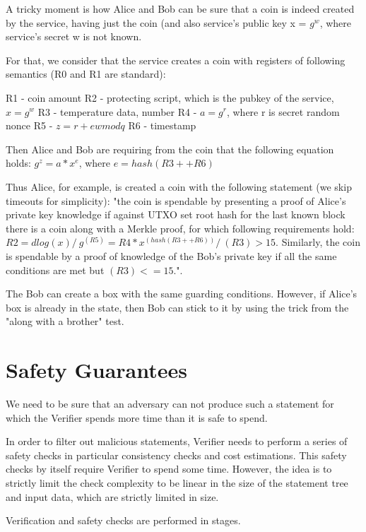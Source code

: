 \documentclass[11pt]{article}
\newcommand{\authnote}[2]{\marginpar{\parbox{\marginparwidth}{\tiny %
  \textsf{#1 {\textcolor{blue}{notes: #2}}}}}%
  \textcolor{blue}{\textbf{\dag}}}
\newcommand{\authnote}[2]{
  \textsf{#1 \textcolor{blue}{: #2}}}
\newcommand{\authnote}[2]{}
\newcommand{\knote}[1]{{\authnote{\textcolor{green}{kushti notes}}{#1}}}
\begin{document}
A tricky moment is how Alice and Bob can be sure that a coin is indeed created by the service, having just the coin (and also service's public key x = $g^w$, where service's secret w is not known.
    
For that, we consider that the service creates a coin with registers of following semantics (R0 and R1 are standard):
    
R1 - coin amount
R2 - protecting script, which is the pubkey of the service, $x = g^w$
R3 - temperature data, number
R4 - $a = g^r$, where r is secret random nonce
R5 - $z = r + ew mod q$
R6 - timestamp
    
Then Alice and Bob are requiring from the coin that the following equation holds: $g^z = a * x^e$, where $e = hash(R3 ++ R6)$
    
Thus Alice, for example, is created a coin with the following statement (we skip timeouts for simplicity):
"the coin is spendable by presenting a proof of Alice's private key knowledge if against UTXO set root hash for
the last known block there is a coin along with a Merkle proof, for which following requirements hold:
$R2 = dlog(x) /\ g^(R5) = R4 * x^(hash(R3 ++ R6)) /\ (R3) > 15$. Similarly, the coin is spendable by a proof of
knowledge of the Bob's private key if all the same conditions are met but $(R3) <= 15$.".
    
The Bob can create a box with the same guarding conditions. However, if Alice's box is already in the state, then Bob can stick to it by using the trick from the "along with a brother" test.


\section{Safety Guarantees}
\label{sec:safety}

We need to be sure that an adversary can not produce such a statement for
which the Verifier spends more time than it is safe to spend. \knote{links to
verifier dilemma, orphan rates etc}

In order to filter out malicious statements, Verifier needs to perform a
series of safety checks in particular consistency checks and cost
estimations. This safety checks by itself require Verifier to spend some
time. However, the idea is to strictly limit the check complexity to be
linear in the size of the statement tree and input data, which are strictly
limited in size.

Verification and safety checks are performed in stages.
\end{document}
